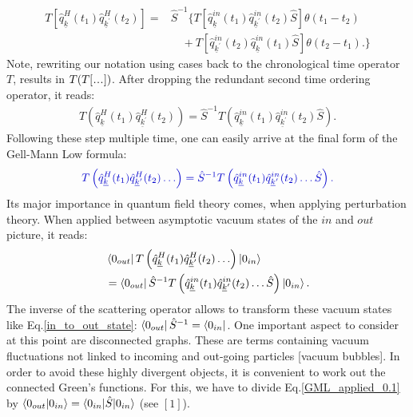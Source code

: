 \documentclass[
11pt, %
english, %
singlespacing, %
headsepline, %
]{MastersDoctoralThesis} %
\newcommand\mydots{\makebox[1em][c]{.\hfil.\hfil.}}
\begin{document}
\begin{equation}
\begin{split}
T\left[
\hat{q}^{H}_{\underline{k}}(t_1)
\hat{q}^{H}_{\underline{k}^{\prime}}(t_2)
\right]=
&\hat{S}^{-1}
\Big\{
T\left[
	\hat{q}^{in}_{\underline{k}}(t_1)
	\hat{q}^{in}_{\underline{k}^{\prime}}(t_2)
	\hat{S}
\right]
				  \theta(t_1 - t_2)
	\\				  
				 &\quad +
T\left[
	\hat{q}^{in}_{\underline{k}^{\prime}}(t_2)
	\hat{q}^{in}_{\underline{k}}(t_1)
	\hat{S}
\right]
        \theta(t_2 - t_1).
    \Big\}  
    \end{split}
\end{equation}
Note, rewriting our notation using cases back to the chronological time operator $ T $, results in $ T(T[\mydots]) $. After dropping the redundant second time ordering operator, it reads:
\begin{equation}\label{Gell-Mann_Low_formula_for_2}
\begin{split}
T\left( 
\hat{q}^{H}_{\underline{k}}(t_1)
\hat{q}^{H}_{\underline{k}^{\prime}}(t_2)
\right) 
=
\hat{S}^{-1}
T\left( 
\hat{q}^{in}_{\underline{k}}(t_1)
\hat{q}^{in}_{\underline{k}^{\prime}}(t_2)
\hat{S}
\right).
    \end{split}
\end{equation}
Following these step multiple time, one can easily  arrive at the final form of the Gell-Mann Low formula:
\begin{equation}\label{Gell-Mann_Low_formula}
\begin{split}
\textcolor[RGB]{0,0,204}{
T\left( 
\hat{q}^{H}_{\underline{k}}(t_1)
\hat{q}^{H}_{\underline{k}^{\prime}}(t_2)
\ldots
\right) 
=
\hat{S}^{-1}
T\left( 
\hat{q}^{in}_{\underline{k}}(t_1)
\hat{q}^{in}_{\underline{k}^{\prime}}(t_2)
\ldots
\hat{S}
\right).
}
    \end{split}
\end{equation}
Its major importance in quantum field theory comes, when applying perturbation theory. When applied between asymptotic vacuum states of the $ in $ and $ out $ picture, it reads:
\begin{equation}\label{GML_applied_0.1}
\begin{split}
&\bra{0_{out}}
T\left( 
\hat{q}^{H}_{\underline{k}}(t_1)
\hat{q}^{H}_{\underline{k}^{\prime}}(t_2)
\ldots
\right) 
\ket{0_{in}}
\\
&=
\bra{0_{out}}
\hat{S}^{-1}
T\left( 
\hat{q}^{in}_{\underline{k}}(t_1)
\hat{q}^{in}_{\underline{k}^{\prime}}(t_2)
\ldots
\hat{S}
\right)
\ket{0_{in}}
.
\end{split}
\end{equation}
The inverse of the scattering operator allows to transform these vacuum states like Eq.\enskip\eqref{in_to_out_state}: $\bra{0_{out}}\hat{S}^{-1}=\bra{0_{in}}$. One important aspect to consider at this point are disconnected graphs. These are terms containing vacuum fluctuations not linked to incoming and out-going particles [vacuum bubbles]. In order to avoid these highly divergent objects, it is convenient to work out the connected Green's functions. For this, we have to divide Eq.\enskip\eqref{GML_applied_0.1} by $ \braket{0_{out}|0_{in}} = \braket{0_{in}|\hat{S}|0_{in}} $ (see $ [1]$).
\newpage
\end{document}
